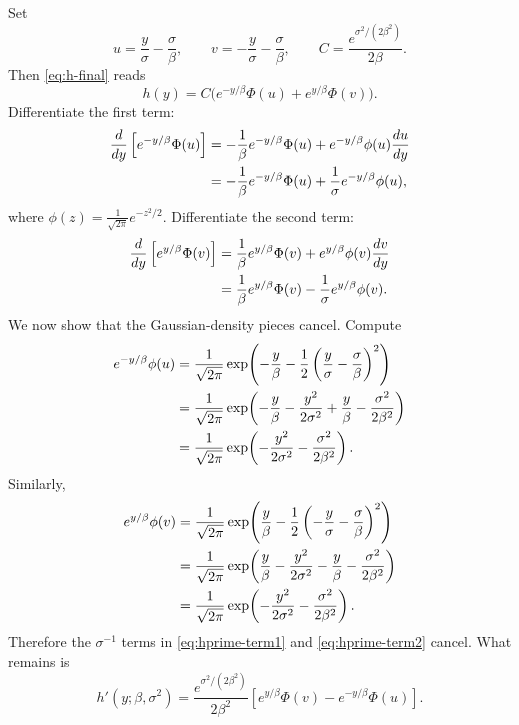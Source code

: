 \documentclass[11pt,a4paper]{article}
\newcommand{\PhiN}{\Phi}
\begin{document}
Set
\[
u = \frac{y}{\sigma} - \frac{\sigma}{\beta},
\qquad
v = -\frac{y}{\sigma} - \frac{\sigma}{\beta},
\qquad
C = \frac{e^{\sigma^2/(2\beta^2)}}{2\beta}.
\]
Then \eqref{eq:h-final} reads
\[
h(y) = C \bigl(e^{-y/\beta}\PhiN(u) + e^{y/\beta}\PhiN(v)\bigr).
\]
Differentiate the first term:
\begin{align}
\frac{d}{dy}\left[e^{-y/\beta}\PhiN(u)\right]
&=
-\frac{1}{\beta} e^{-y/\beta}\PhiN(u)
+
 e^{-y/\beta} \phi(u) \frac{du}{dy}
\notag\\
&=
-\frac{1}{\beta} e^{-y/\beta}\PhiN(u)
+
\frac{1}{\sigma} e^{-y/\beta} \phi(u),
\label{eq:hprime-term1}
\end{align}
where $\phi(z)=\frac{1}{\sqrt{2\pi}} e^{-z^2/2}$.
Differentiate the second term:
\begin{align}
\frac{d}{dy}\left[e^{y/\beta}\PhiN(v)\right]
&=
\frac{1}{\beta} e^{y/\beta}\PhiN(v)
+
 e^{y/\beta} \phi(v) \frac{dv}{dy}
\notag\\
&=
\frac{1}{\beta} e^{y/\beta}\PhiN(v)
-
\frac{1}{\sigma} e^{y/\beta} \phi(v).
\label{eq:hprime-term2}
\end{align}
We now show that the Gaussian-density pieces cancel. Compute
\begin{align}
e^{-y/\beta} \phi(u)
&=
\frac{1}{\sqrt{2\pi}}
\exp\!\left(
-\frac{y}{\beta}
-\frac12 \left(\frac{y}{\sigma}-\frac{\sigma}{\beta}\right)^2
\right)
\notag\\
&=
\frac{1}{\sqrt{2\pi}}
\exp\!\left(
-\frac{y}{\beta}
-\frac{y^2}{2\sigma^2}
+\frac{y}{\beta}
-\frac{\sigma^2}{2\beta^2}
\right)
\notag\\
&=
\frac{1}{\sqrt{2\pi}}
\exp\!\left(-\frac{y^2}{2\sigma^2} - \frac{\sigma^2}{2\beta^2}\right).
\label{eq:phi-cancel-1}
\end{align}
Similarly,
\begin{align}
e^{y/\beta} \phi(v)
&=
\frac{1}{\sqrt{2\pi}}
\exp\!\left(
\frac{y}{\beta}
-\frac12 \left(-\frac{y}{\sigma}-\frac{\sigma}{\beta}\right)^2
\right)
\notag\\
&=
\frac{1}{\sqrt{2\pi}}
\exp\!\left(
\frac{y}{\beta}
-\frac{y^2}{2\sigma^2}
-\frac{y}{\beta}
-\frac{\sigma^2}{2\beta^2}
\right)
\notag\\
&=
\frac{1}{\sqrt{2\pi}}
\exp\!\left(-\frac{y^2}{2\sigma^2} - \frac{\sigma^2}{2\beta^2}\right).
\label{eq:phi-cancel-2}
\end{align}
Therefore the $\sigma^{-1}$ terms in \eqref{eq:hprime-term1} and \eqref{eq:hprime-term2} cancel. What remains is
\begin{equation}
h'(y;\beta,\sigma^2)
=
\frac{e^{\sigma^2/(2\beta^2)}}{2\beta^2}
\left[
 e^{y/\beta}\PhiN(v)
 -
 e^{-y/\beta}\PhiN(u)
\right].
\label{eq:hprime-final}
\end{equation}
\end{document}
